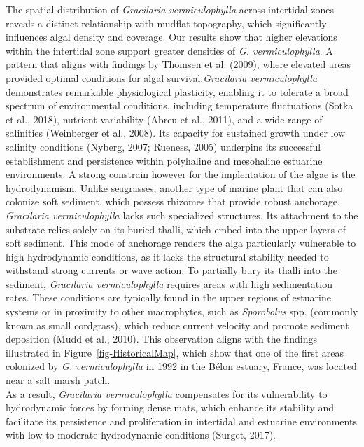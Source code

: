 \documentclass[
  letterpaper,
  DIV=11,
  numbers=noendperiod]{scrartcl}
\begin{document}
The spatial distribution of \emph{Gracilaria vermiculophylla} across
intertidal zones reveals a distinct relationship with mudflat
topography, which significantly influences algal density and coverage.
Our results show that higher elevations within the intertidal zone
support greater densities of \emph{G. vermiculophylla}. A pattern that
aligns with findings by Thomsen et al. (2009), where elevated areas
provided optimal conditions for algal survival.\emph{Gracilaria
vermiculophylla} demonstrates remarkable physiological plasticity,
enabling it to tolerate a broad spectrum of environmental conditions,
including temperature fluctuations (Sotka et al., 2018), nutrient
variability (Abreu et al., 2011), and a wide range of salinities
(Weinberger et al., 2008). Its capacity for sustained growth under low
salinity conditions (Nyberg, 2007; Rueness, 2005) underpins its
successful establishment and persistence within polyhaline and
mesohaline estuarine environments. A strong constrain however for the
implentation of the algae is the hydrodynamism. Unlike seagrasses,
another type of marine plant that can also colonize soft sediment, which
possess rhizomes that provide robust anchorage, \emph{Gracilaria
vermiculophylla} lacks such specialized structures. Its attachment to
the substrate relies solely on its buried thalli, which embed into the
upper layers of soft sediment. This mode of anchorage renders the alga
particularly vulnerable to high hydrodynamic conditions, as it lacks the
structural stability needed to withstand strong currents or wave action.
To partially bury its thalli into the sediment, \emph{Gracilaria
vermiculophylla} requires areas with high sedimentation rates. These
conditions are typically found in the upper regions of estuarine systems
or in proximity to other macrophytes, such as \emph{Sporobolus} spp.
(commonly known as small cordgrass), which reduce current velocity and
promote sediment deposition (Mudd et al., 2010). This observation aligns
with the findings illustrated in Figure~\ref{fig-HistoricalMap}, which
show that one of the first areas colonized by \emph{G. vermiculophylla}
in 1992 in the Bélon estuary, France, was located near a salt marsh
patch.\\
As a result, \emph{Gracilaria vermiculophylla} compensates for its
vulnerability to hydrodynamic forces by forming dense mats, which
enhance its stability and facilitate its persistence and proliferation
in intertidal and estuarine environments with low to moderate
hydrodynamic conditions (Surget, 2017).
\end{document}
